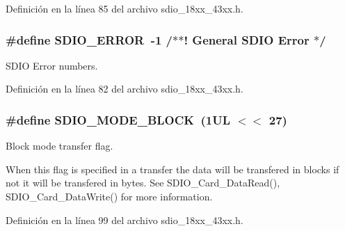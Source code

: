 Definición en la línea 85 del archivo sdio\+\_\+18xx\+\_\+43xx.\+h.

\subsubsection[{\texorpdfstring{S\+D\+I\+O\+\_\+\+E\+R\+R\+OR}{SDIO_ERROR}}]{\setlength{\rightskip}{0pt plus 5cm}\#define S\+D\+I\+O\+\_\+\+E\+R\+R\+OR~-\/1 /$\ast$$\ast$! General S\+D\+IO Error $\ast$/}\hypertarget{group___s_d_i_o__18_x_x__43_x_x_ga4a2fc3d864c16f1ddea88220e19b15a1}{}\label{group___s_d_i_o__18_x_x__43_x_x_ga4a2fc3d864c16f1ddea88220e19b15a1}


S\+D\+IO Error numbers. 



Definición en la línea 82 del archivo sdio\+\_\+18xx\+\_\+43xx.\+h.

\subsubsection[{\texorpdfstring{S\+D\+I\+O\+\_\+\+M\+O\+D\+E\+\_\+\+B\+L\+O\+CK}{SDIO_MODE_BLOCK}}]{\setlength{\rightskip}{0pt plus 5cm}\#define S\+D\+I\+O\+\_\+\+M\+O\+D\+E\+\_\+\+B\+L\+O\+CK~(1\+U\+L $<$$<$ 27)}\hypertarget{group___s_d_i_o__18_x_x__43_x_x_gaf7c4f9dbe3ed7f3e4f98c8e811bf0658}{}\label{group___s_d_i_o__18_x_x__43_x_x_gaf7c4f9dbe3ed7f3e4f98c8e811bf0658}


Block mode transfer flag. 

When this flag is specified in a transfer the data will be transfered in blocks if not it will be transfered in bytes. See S\+D\+I\+O\+\_\+\+Card\+\_\+\+Data\+Read(), S\+D\+I\+O\+\_\+\+Card\+\_\+\+Data\+Write() for more information. 

Definición en la línea 99 del archivo sdio\+\_\+18xx\+\_\+43xx.\+h.

